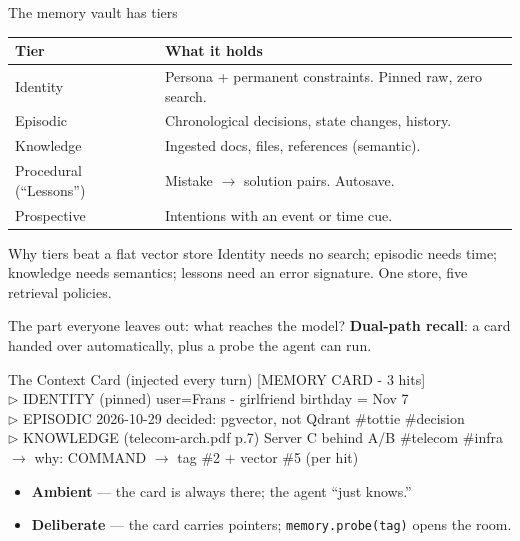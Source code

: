 \documentclass[aspectratio=169,10pt]{beamer}
\begin{document}
\begin{frame}{The memory vault has tiers}
  \begin{tabularx}{\textwidth}{@{}l X@{}}
    \toprule
    \textbf{Tier} & \textbf{What it holds} \\
    \midrule
    Identity & Persona + permanent constraints. Pinned raw, zero search. \\
    Episodic & Chronological decisions, state changes, history. \\
    Knowledge & Ingested docs, files, references (semantic). \\
    Procedural (``Lessons'') & Mistake $\rightarrow$ solution pairs. Autosave. \\
    Prospective & Intentions with an event or time cue. \\
    \bottomrule
  \end{tabularx}
  \vfill
  \begin{block}{Why tiers beat a flat vector store}
    Identity needs no search; episodic needs time; knowledge needs semantics; lessons need an error
    signature. One store, five retrieval policies.
  \end{block}
\end{frame}

\begin{frame}{The part everyone leaves out: what reaches the model?}
  \textbf{Dual-path recall}: a card handed over automatically, plus a probe the agent can run.
  \begin{block}{The Context Card (injected every turn)}
    \ttfamily\scriptsize
    [MEMORY CARD - 3 hits]\\[1mm]
    $\triangleright$ IDENTITY (pinned) user=Frans - girlfriend birthday = Nov 7\\
    $\triangleright$ EPISODIC 2026-10-29 decided: pgvector, not Qdrant \#tottie \#decision\\
    $\triangleright$ KNOWLEDGE (telecom-arch.pdf p.7) Server C behind A/B \#telecom \#infra\\
    $\rightarrow$ why: COMMAND $\rightarrow$ tag \#2 + vector \#5 (per hit)
  \end{block}
  \begin{itemize}
    \item \textbf{Ambient} --- the card is always there; the agent ``just knows.''
    \item \textbf{Deliberate} --- the card carries pointers; \texttt{memory.probe(tag)} opens the room.
  \end{itemize}
\end{frame}
\end{document}
